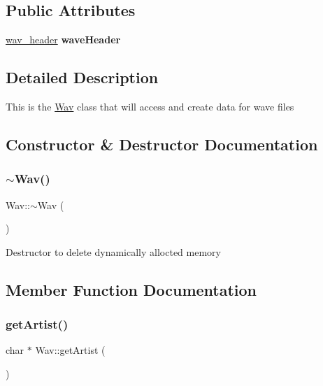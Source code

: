 \subsection*{Public Attributes}
\begin{DoxyCompactItemize}
\item 
\mbox{\label{classWav_ab9465cd3b99f1337fa3a77a639dcd9f3}} 
\hyperlink{structwav__header}{wav\+\_\+header} {\bfseries wave\+Header}
\end{DoxyCompactItemize}


\subsection{Detailed Description}
This is the \hyperlink{classWav}{Wav} class that will access and create data for wave files 

\subsection{Constructor \& Destructor Documentation}
\mbox{\label{classWav_a1510b246ba121b103a60b8e7839af25f}} 
\subsubsection{\texorpdfstring{$\sim$\+Wav()}{~Wav()}}
{\footnotesize\ttfamily Wav\+::$\sim$\+Wav (\begin{DoxyParamCaption}{ }\end{DoxyParamCaption})\hspace{0.3cm}{\ttfamily [virtual]}}

Destructor to delete dynamically allocted memory 

\subsection{Member Function Documentation}
\mbox{\label{classWav_a8704bf014d555855122567dbb75249e7}} 
\subsubsection{\texorpdfstring{get\+Artist()}{getArtist()}}
{\footnotesize\ttfamily char $\ast$ Wav\+::get\+Artist (\begin{DoxyParamCaption}{ }\end{DoxyParamCaption})}


